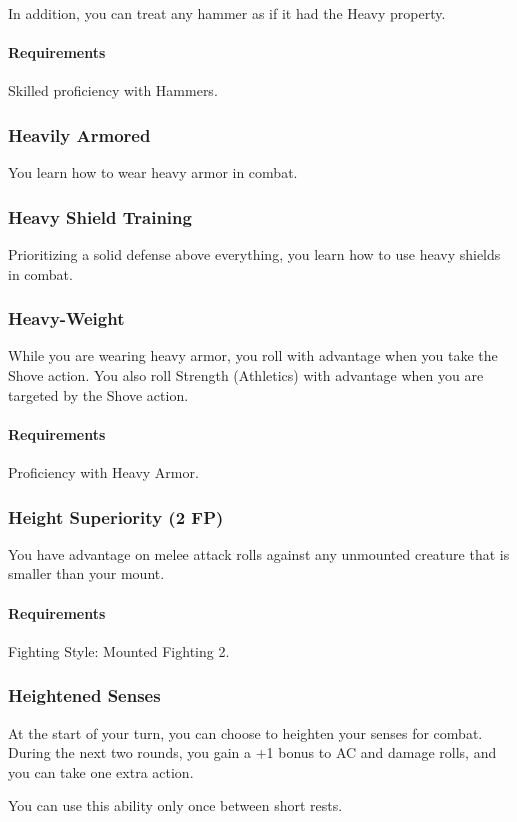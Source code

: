     In addition, you can treat any hammer as if it had the Heavy property.
    \paragraph{Requirements} Skilled proficiency with Hammers.
\subsubsection{Heavily Armored} \label{feat::heavilyarmored}
    You learn how to wear heavy armor in combat.
\subsubsection{Heavy Shield Training} \label{feat::heavyshieldtraining}
    Prioritizing a solid defense above everything, you learn how to use heavy shields in combat.
\subsubsection{Heavy-Weight} \label{feat::heavyweight}
    While you are wearing heavy armor, you roll with advantage when you take the Shove action.
    You also roll Strength (Athletics) with advantage when you are targeted by the Shove action.
    \paragraph{Requirements} Proficiency with Heavy Armor.
\subsubsection{Height Superiority (2 FP)} \label{feat::heightsuperiority}
    You have advantage on melee attack rolls against any unmounted creature that is smaller than your mount.
    \paragraph{Requirements} Fighting Style: Mounted Fighting 2.
\subsubsection{Heightened Senses} \label{feat::heightenedsenses}
    At the start of your turn, you can choose to heighten your senses for combat.
    During the next two rounds, you gain a +1 bonus to AC and damage rolls, and you can take one extra action.

    You can use this ability only once between short rests.
